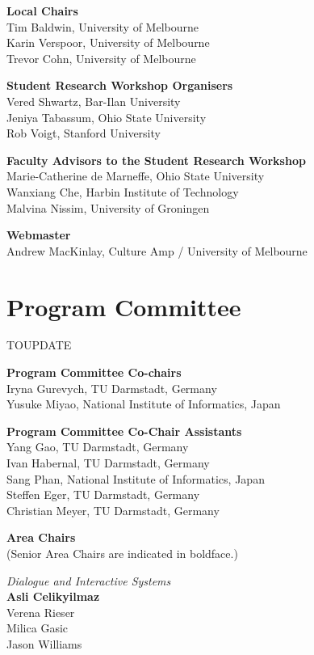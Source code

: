{\bf Local Chairs} \\
Tim Baldwin, University of Melbourne\\
Karin Verspoor, University of Melbourne\\
Trevor Cohn, University of Melbourne

{\bf Student Research Workshop Organisers} \\
Vered Shwartz, Bar-Ilan University\\
Jeniya Tabassum, Ohio State University\\
Rob Voigt, Stanford University

{\bf Faculty Advisors to the Student Research Workshop} \\
Marie-Catherine de Marneffe, Ohio State University\\
Wanxiang Che, Harbin Institute of Technology\\
Malvina Nissim, University of Groningen

{\bf Webmaster} \\
Andrew MacKinlay, Culture Amp / University of Melbourne


\clearpage
\section{Program Committee}
\setlength{\parindent}{0pt}

TOUPDATE %

{\bf Program Committee Co-chairs} \\
Iryna Gurevych, TU Darmstadt, Germany \\
Yusuke Miyao, National Institute of Informatics, Japan

{\bf Program Committee Co-Chair Assistants} \\
Yang Gao, TU Darmstadt, Germany \\
Ivan Habernal, TU Darmstadt, Germany \\
Sang Phan, National Institute of Informatics, Japan \\
Steffen Eger, TU Darmstadt, Germany \\
Christian Meyer, TU Darmstadt, Germany

{\bf Area Chairs} \\
(Senior Area Chairs are indicated in boldface.)

\emph{Dialogue and Interactive Systems} \\
\hspace*{5mm}\textbf{Asli Celikyilmaz} \\
\hspace*{5mm}Verena Rieser \\
\hspace*{5mm}Milica Gasic \\
\hspace*{5mm}Jason Williams

